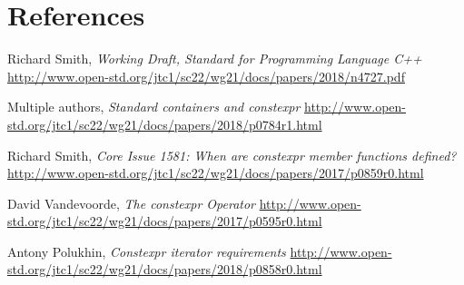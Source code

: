 \documentclass{wg21}
\begin{document}
\section{References}
\renewcommand{\section}[2]{}%
\begin{thebibliography}{9}

  Richard Smith,
  \emph{Working Draft, Standard for Programming Language C++}\newline
  \url{http://www.open-std.org/jtc1/sc22/wg21/docs/papers/2018/n4727.pdf}

  Multiple authors,
  \emph{Standard containers and constexpr}\newline
  \url{http://www.open-std.org/jtc1/sc22/wg21/docs/papers/2018/p0784r1.html}

  Richard Smith,
  \emph{Core Issue 1581: When are constexpr member functions defined?}\newline
  \url{http://www.open-std.org/jtc1/sc22/wg21/docs/papers/2017/p0859r0.html}

  David Vandevoorde,
  \emph{The constexpr Operator}\newline
  \url{http://www.open-std.org/jtc1/sc22/wg21/docs/papers/2017/p0595r0.html}

  Antony Polukhin,
  \emph{Constexpr iterator requirements}\newline
  \url{http://www.open-std.org/jtc1/sc22/wg21/docs/papers/2018/p0858r0.html}

\end{thebibliography}
\end{document}
